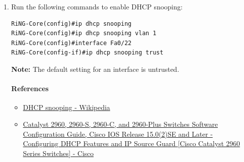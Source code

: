 \documentclass[12pt, a4paper]{article}
\begin{document}
\begin{enumerate}
    \item Run the following commands to enable DHCP snooping:
\begin{verbatim}
RiNG-Core(config)#ip dhcp snooping
RiNG-Core(config)#ip dhcp snooping vlan 1
RiNG-Core(config)#interface Fa0/22
RiNG-Core(config-if)#ip dhcp snooping trust
\end{verbatim}
    \textbf{Note:} The default setting for an interface is untrusted.

    \paragraph{References}
    \begin{itemize}
      \item \href{https://en.wikipedia.org/wiki/DHCP_snooping}{DHCP snooping - Wikipedia}
      \item \href{https://www.cisco.com/c/en/us/td/docs/switches/lan/catalyst2960/software/release/15-0_2_se/configuration/guide/scg2960/swdhcp82.html}{Catalyst 2960, 2960-S, 2960-C, and 2960-Plus Switches Software Configuration Guide, Cisco IOS Release 15.0(2)SE and Later - Configuring DHCP Features and IP Source Guard [Cisco Catalyst 2960 Series Switches] - Cisco}
    \end{itemize}
  \end{enumerate}
\end{document}
